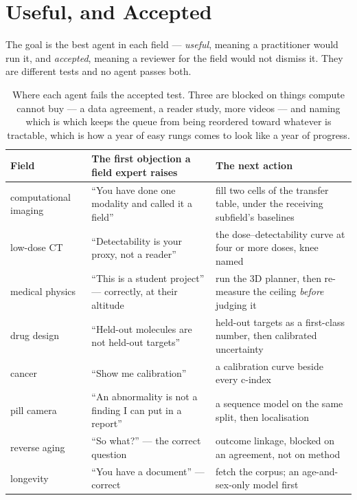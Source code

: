 \section{Useful, and Accepted}\label{sec:useful}

The goal is the best agent in each field --- \emph{useful}, meaning a practitioner would run it, and \emph{accepted}, meaning a reviewer for the field would not dismiss it. They are different tests and no agent passes both.

\begin{table}[!htbp]
\centering\small
\begin{tabularx}{\textwidth}{@{}lYY@{}}
\toprule
Field & The first objection a field expert raises & The next action \\
\midrule
computational imaging & ``You have done one modality and called it a field'' & fill two cells of the transfer table, under the receiving subfield's baselines \\
low-dose CT & ``Detectability is your proxy, not a reader'' & the dose--detectability curve at four or more doses, knee named \\
medical physics & ``This is a student project'' --- correctly, at their altitude & run the 3D planner, then re-measure the ceiling \emph{before} judging it \\
drug design & ``Held-out molecules are not held-out targets'' & held-out targets as a first-class number, then calibrated uncertainty \\
cancer & ``Show me calibration'' & a calibration curve beside every c-index \\
pill camera & ``An abnormality is not a finding I can put in a report'' & a sequence model on the same split, then localisation \\
reverse aging & ``So what?'' --- the correct question & outcome linkage, blocked on an agreement, not on method \\
longevity & ``You have a document'' --- correct & fetch the corpus; an age-and-sex-only model first \\
\bottomrule
\end{tabularx}
\caption{Where each agent fails the accepted test. Three are blocked on things compute cannot buy --- a data agreement, a reader study, more videos --- and naming which is which keeps the queue from being reordered toward whatever is tractable, which is how a year of easy rungs comes to look like a year of progress.}
\label{tab:objections}
\end{table}

